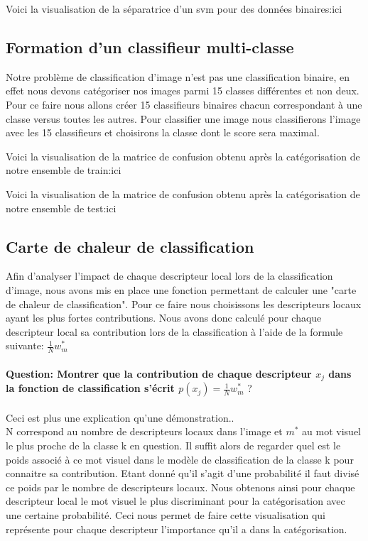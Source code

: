 \documentclass[a4paper]{article}
\begin{document}
Voici la visualisation de la séparatrice d'un svm pour des données binaires:ici
\subsection{Formation d'un classifieur multi-classe}
Notre problème de classification d'image n'est pas une classification binaire, en effet nous devons catégoriser nos images parmi 15 classes différentes et non deux. Pour ce faire nous allons créer 15 classifieurs binaires chacun correspondant à une classe versus toutes les autres. Pour classifier une image nous classifierons l'image avec les 15 classifieurs et choisirons la classe dont le score sera maximal.

Voici la visualisation de la matrice de confusion obtenu après la catégorisation de notre ensemble de train:ici

Voici la visualisation de la matrice de confusion obtenu après la catégorisation de notre ensemble de test:ici
\subsection{Carte de chaleur de classification}
Afin d'analyser l'impact de chaque descripteur local lors de la classification d'image, nous avons mis en place une fonction permettant de calculer une "carte de chaleur de classification". Pour ce faire nous choisissons les descripteurs locaux ayant les plus fortes contributions. Nous avons donc calculé pour chaque descripteur local sa contribution lors de la classification à l'aide de la formule suivante:  $\frac{1}{N}  w_m^*$ \\\\
\textbf{Question: Montrer que la contribution de chaque descripteur $x_j$ dans la fonction de classification s'écrit $p(x_j) = \frac{1}{N}  w_m^*$} ?\\\\
Ceci est plus une explication qu'une démonstration..\\
N correspond au nombre de descripteurs locaux dans l'image et $m^*$ au mot visuel le plus proche de la classe k en question. Il suffit alors de regarder quel est le poids associé à ce mot visuel dans le modèle de classification de la classe k pour connaitre sa contribution. Etant donné qu'il s'agit d'une probabilité il faut divisé ce poids par le nombre de descripteurs locaux. Nous obtenons ainsi pour chaque descripteur local le mot visuel le plus discriminant pour la catégorisation avec une certaine probabilité. Ceci nous permet de faire cette visualisation qui représente pour chaque descripteur l'importance qu'il a dans la catégorisation. \\
\end{document}
